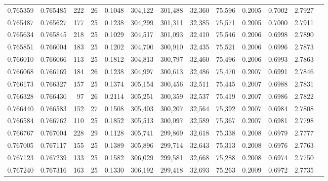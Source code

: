 \begin{tabular}{rrrrrrrrrrrrr}
0.765359 & 0.765485 &   222 &  26 &                                     0.1048 & 304,122 & 301,488 &  32,360 &  75,596 & 0.2005 & 0.7002 & 2.7927 \\
0.765487 & 0.765627 &   177 &  25 &                                     0.1238 & 304,299 & 301,311 &  32,385 &  75,571 & 0.2005 & 0.7000 & 2.7911 \\
0.765634 & 0.765845 &   218 &  25 &                                     0.1029 & 304,517 & 301,093 &  32,410 &  75,546 & 0.2006 & 0.6998 & 2.7890 \\
0.765851 & 0.766004 &   183 &  25 &                                     0.1202 & 304,700 & 300,910 &  32,435 &  75,521 & 0.2006 & 0.6996 & 2.7873 \\
0.766010 & 0.766066 &   113 &  25 &                                     0.1812 & 304,813 & 300,797 &  32,460 &  75,496 & 0.2006 & 0.6993 & 2.7863 \\
0.766068 & 0.766169 &   184 &  26 &                                     0.1238 & 304,997 & 300,613 &  32,486 &  75,470 & 0.2007 & 0.6991 & 2.7846 \\
0.766173 & 0.766327 &   157 &  25 &                                     0.1374 & 305,154 & 300,456 &  32,511 &  75,445 & 0.2007 & 0.6988 & 2.7831 \\
0.766328 & 0.766430 &    97 &  26 &                                     0.2114 & 305,251 & 300,359 &  32,537 &  75,419 & 0.2007 & 0.6986 & 2.7822 \\
0.766440 & 0.766583 &   152 &  27 &                                     0.1508 & 305,403 & 300,207 &  32,564 &  75,392 & 0.2007 & 0.6984 & 2.7808 \\
0.766584 & 0.766762 &   110 &  25 &                                     0.1852 & 305,513 & 300,097 &  32,589 &  75,367 & 0.2007 & 0.6981 & 2.7798 \\
0.766767 & 0.767004 &   228 &  29 &                                     0.1128 & 305,741 & 299,869 &  32,618 &  75,338 & 0.2008 & 0.6979 & 2.7777 \\
0.767005 & 0.767117 &   155 &  25 &                                     0.1389 & 305,896 & 299,714 &  32,643 &  75,313 & 0.2008 & 0.6976 & 2.7763 \\
0.767123 & 0.767239 &   133 &  25 &                                     0.1582 & 306,029 & 299,581 &  32,668 &  75,288 & 0.2008 & 0.6974 & 2.7750 \\
0.767240 & 0.767316 &   163 &  25 &                                     0.1330 & 306,192 & 299,418 &  32,693 &  75,263 & 0.2009 & 0.6972 & 2.7735 \\

\end{tabular}
